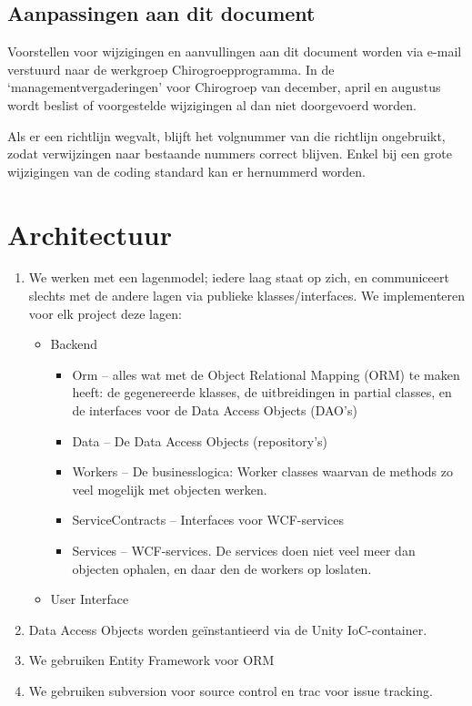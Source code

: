 \documentclass[a4paper,11pt]{article}
\begin{document}
\subsection{Aanpassingen aan dit document}

Voorstellen voor wijzigingen en aanvullingen aan dit document worden via
e-mail verstuurd naar de werkgroep Chirogroepprogramma.  In de
`managementvergaderingen' voor Chirogroep van december, april en augustus
wordt beslist of voorgestelde wijzigingen al dan niet doorgevoerd worden.

Als er een richtlijn wegvalt, blijft het volgnummer van die richtlijn
ongebruikt, zodat verwijzingen naar bestaande nummers correct blijven.
Enkel bij een grote wijzigingen van de coding standard kan er
hernummerd worden.

\section{Architectuur}

\begin{enumerate}
\item We werken met een lagenmodel; iedere laag staat op zich, en communiceert slechts met de
andere lagen via publieke klasses/interfaces.  We implementeren voor elk
project deze lagen:
\begin{itemize}
\item Backend
\begin{itemize}
\item Orm -- alles wat met de Object Relational Mapping (ORM) te
maken heeft: de gegenereerde klasses, de uitbreidingen in partial classes,
en de interfaces voor de Data Access Objects (DAO's)
\item Data -- De Data Access Objects (repository's)
\item Workers -- De businesslogica: Worker classes waarvan de methods zo
veel mogelijk met objecten werken.
\item ServiceContracts -- Interfaces voor WCF-services
\item Services -- WCF-services.  De services doen niet veel meer dan
objecten ophalen, en daar den de workers op loslaten.
\end{itemize}
\item User Interface
\end{itemize}
\item Data Access Objects worden ge\"instantieerd via de Unity
IoC-container.
\item We gebruiken Entity Framework voor ORM
\item We gebruiken subversion voor source control en trac voor issue
tracking.
\end{enumerate}
\end{document}
